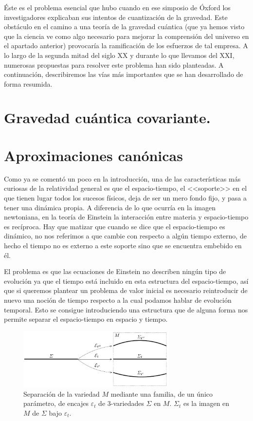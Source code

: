 \documentclass[11pt,a4paper,titlepage]{article}
\begin{document}
Éste es el problema esencial que hubo cuando en ese simposio de Óxford los investigadores explicaban sus intentos de cuantización de la gravedad. Este obstáculo en el camino a una teoría de la gravedad cuántica (que ya hemos visto que la ciencia ve como algo necesario para mejorar la comprensión del universo en el apartado anterior) provocaría la ramificación de los esfuerzos de tal empresa. A lo largo de la segunda mitad del siglo XX y durante lo que llevamos del XXI, numerosas propuestas para resolver este problema han sido planteadas. A continuación, describiremos las vías más importantes que se han desarrollado de forma resumida.
%
%
%
%
\newpage
\section{Gravedad cuántica covariante.} %

%
%
%
%
\newpage
\section{Aproximaciones canónicas} %

Como ya se comentó un poco en la introducción, una de las características más curiosas de la relatividad general es que el espacio-tiempo, el <<soporte>> en el que tienen lugar todos los sucesos físicos, deja de ser un mero fondo fijo, y pasa a tener una dinámica propia. A diferencia de lo que ocurría en la imagen newtoniana, en la teoría de Einstein la interacción entre materia y espacio-tiempo es recíproca. Hay que matizar que cuando se dice que el espacio-tiempo es dinámico, no nos referimos a que cambie con respecto a algún tiempo externo, de hecho el tiempo no es externo a este soporte sino que se encuentra embebido en él.

El problema es que las ecuaciones de Einstein no describen ningún tipo de evolución ya que el tiempo está incluido en esta estructura del espacio-tiempo, así que si queremos plantear un problema de valor inicial es necesario reintroducir de nuevo una noción de tiempo respecto a la cual podamos hablar de evolución temporal. Esto se consigue introduciendo una estructura que de alguna forma nos permite separar el espacio-tiempo en espacio y tiempo.

\begin{figure}[ht]
\centering
\includegraphics[width=0.7\textwidth]{FoilM.png}
\caption{Separación de la variedad $M$ mediante una familia, de un único parámetro, de encajes $\varepsilon_t$ de 3-variedades $\Sigma$ en $M$. $\Sigma_t$ es la imagen en $M$ de $\Sigma$ bajo $\varepsilon_t$.}
\label{fig:FoilM}
\end{figure}
\end{document}
